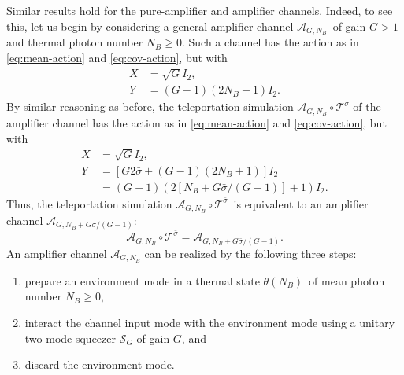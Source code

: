 \documentclass[apsrev,twocolumn]{revtex4-1}%
\begin{document}
Similar results hold for the pure-amplifier and amplifier channels. Indeed, to
see this, let us begin by considering a general amplifier channel
$\mathcal{A}_{G,N_{B}}$\ of gain $G>1$ and thermal photon number $N_{B}\geq0$.
Such a channel has the action as in \eqref{eq:mean-action} and
\eqref{eq:cov-action}, but with%
\begin{align}
X  &  =\sqrt{G}I_{2},\\
Y  &  =(G-1)(2N_{B}+1)I_{2}.
\end{align}
By similar reasoning as before, the teleportation simulation $\mathcal{A}%
_{G,N_{B}}\circ\mathcal{T}^{\bar{\sigma}}$ of the amplifier channel has the
action as in \eqref{eq:mean-action} and \eqref{eq:cov-action}, but with%
\begin{align}
X  &  =\sqrt{G}I_{2},\\
Y  &  =\left[  G 2 \bar{\sigma}+(G-1)(2N_{B}+1)\right]  I_{2}\\
&  =(G-1)(2\left[  N_{B}+G\bar{\sigma}/(G-1)\right]  +1)I_{2}.
\end{align}
Thus, the teleportation simulation $\mathcal{A}_{G,N_{B}}\circ\mathcal{T}%
^{\bar{\sigma}}$\ is equivalent to an amplifier channel $\mathcal{A}%
_{G,N_{B}+G\bar{\sigma}/(G-1)}$:%
\begin{equation}
\mathcal{A}_{G,N_{B}}\circ\mathcal{T}^{\bar{\sigma}}=\mathcal{A}%
_{G,N_{B}+G\bar{\sigma}/(G-1)}.
\end{equation}
An amplifier channel $\mathcal{A}_{G,N_{B}}$ can be realized by the following
three steps:

\begin{enumerate}
\item prepare an environment mode in a thermal state $\theta(N_{B})$\ of mean
photon number $N_{B}\geq0$,

\item interact the channel input mode with the environment mode using a
unitary two-mode squeezer $\mathcal{S}_{G}$ of gain $G$, and

\item discard the environment mode.
\end{enumerate}
\end{document}
